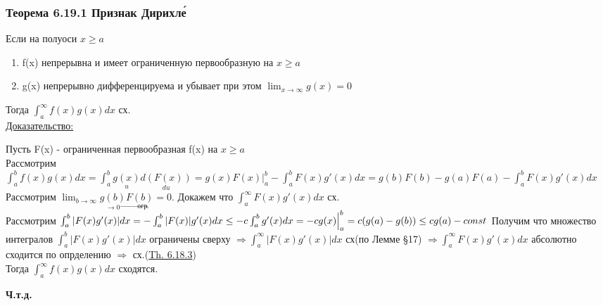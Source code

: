 \documentclass[12pt]{article}
\begin{document}
    \subsubsection*{Теорема 6.19.1 Признак Дирихле́}\label{th:6.19.1}
    Если на полуоси $x\geq a$\par\noindent
    \begin{enumerate}
        \item f(x) непрерывна и имеет ограниченную первообразную на $x\geq a$
        \item g(x) непрерывно дифференцируема и убывает при этом $\lim_{x \to \infty}g(x)=0$
    \end{enumerate}
    Тогда $\int_{a}^{\infty}f(x)g(x)dx$ сх.\\
    \underline{Доказательство:}
    \begin{adjustwidth}{1.5em}{1.5em}
        Пусть F(x) - ограниченная первообразная f(x) на $x \geq a$\\
        Рассмотрим $\int_{a}^{b}f(x)g(x)dx=\int_{a}^{b}\underset{u}{g(x)} \underset{du}{d(F(x))}=g(x)F(x)\Big|^b_a-\int_{a}^{b}F(x)g'(x)dx=
        g(b)F(b)-g(a)F(a)-\int_{a}^{b}F(x)g'(x)dx$\\
        Рассмотрим $\lim_{b \to \infty}\underset{\rightarrow 0}{g(b)} \underset{\rightarrow \text{огр.}}{F(b)}=0.$ Докажем что $\int_{a}^{\infty}F(x)g'(x)dx$ сх.\\
        Рассмотрим $\int_{a}^{b}|F(x)g'(x)|dx=-\int_{a}^{b}|F(x)|g'(x)dx \leq -c \int_{a}^{b}g'(x)dx=-c g(x)\Big|^b_a=\\c(g(a)-g(b))\leq cg(a)-const$
        Получим что множество интегралов $\int_{a}^{b}|F(x)g'(x)|dx$ ограничены сверху $\Rightarrow \int_{a}^{\infty}|F(x)g'(x)|dx$ сх(по Лемме \S 17)
        $\Rightarrow \int_{a}^{\infty}F(x)g'(x)dx$ абсолютно сходится по опрделению $\Rightarrow$ сх.(\hyperref[th:6.18.3]{Th. 6.18.3})\\
        Тогда $\int_{a}^{\infty}f(x)g(x)dx$ сходятся. 
    \end{adjustwidth}
    \begin{center}
        \textbf{Ч.т.д.}
    \end{center}
\end{document}
